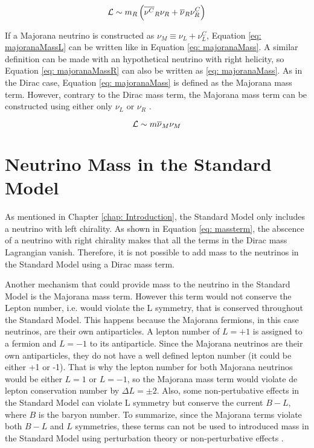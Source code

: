 \begin{equation}\label{eq: majoranaMassR}
\mathcal{L} \sim m_{R}\left(\overline{\nu^{C}}_{R}\nu_{R}  + \overline{\nu}_{R}\nu^{C}_{R}\right) 
\end{equation}

If a Majorana neutrino is constructed as $\nu_{M} \equiv \nu_{L} + \nu_{L}^{C}$, Equation \ref{eq: majoranaMassL} can be written like in Equation \ref{eq: majoranaMass}. A similar definition can be made with an hypothetical neutrino with right helicity, so Equation \ref{eq: majoranaMassR} can also be written as \ref{eq: majoranaMass}. As in the Dirac case, Equation \ref{eq: majoranaMass} is defined as the Majorana mass term. However, contrary to the Dirac mass term, the Majorana mass term can be constructed using either only $\nu_{L}$ or $\nu_{R}$ \cite{NeutrinoMass}. 

\begin{equation}\label{eq: majoranaMass}
\mathcal{L} \sim m\overline{\nu}_{M}\nu_{M}
\end{equation}


\section{Neutrino Mass in the Standard Model}

As mentioned in Chapter \ref{chap: Introduction}, the Standard Model only includes a neutrino with left chirality. As shown in Equation \ref{eq: massterm}, the abscence of a neutrino with right chirality makes that all the terms in the Dirac mass Lagrangian vanish. Therefore, it is not possible to add mass to the neutrinos in the Standard Model using a Dirac mass term.

Another mechanism that could provide mass to the neutrino in the Standard Model is the Majorana mass term. However this term would not conserve the Lepton number, i.e. would violate the L symmetry, that is conserved throughout the Standard Model\cite{NeutrinoMass2}. This happens because the Majorana fermions, in this case neutrinos, are their own antiparticles. A lepton number of $L = +1$ is assigned to a fermion and $L = -1$ to its antiparticle. Since the Majorana neutrinos are their own antiparticles, they do not have a well defined lepton number (it could be either +1 or -1). That is why the lepton number for both Majorana neutrinos would be either $L = 1$ or $L = -1$, so the Majorana mass term would violate de lepton conservation number by $\Delta L = \pm 2$. Also, some non-pertubative effects in the Standard Model can violate L symmetry but conserve the current $B - L$, where $B$ is the baryon number. To summarize, since the Majorana terms violate both $B-L$ and $L$ symmetries, these terms can not be used to introduced mass in the Standard Model using perturbation theory or non-perturbative effects \cite{NeutrinoMass2}.  

